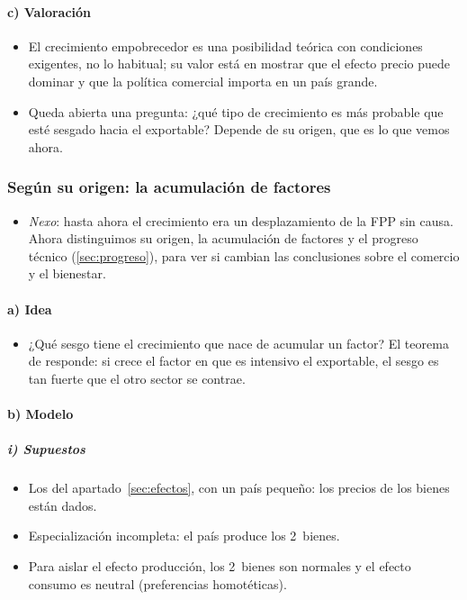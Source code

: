 \documentclass[11pt]{article}
\begin{document}
\paragraph{c) Valoración}

\begin{itemize}
\item El crecimiento empobrecedor es una posibilidad teórica con condiciones exigentes, no lo habitual; su valor está en mostrar que el efecto precio puede dominar y que la política comercial importa en un país grande.
\item Queda abierta una pregunta: ¿qué tipo de crecimiento es más probable que esté sesgado hacia el exportable? Depende de su origen, que es lo que vemos ahora.
\end{itemize}

\subsubsection{Según su origen: la acumulación de factores}\label{sec:origen}

\begin{itemize}
\item \emph{Nexo}: hasta ahora el crecimiento era un desplazamiento de la FPP sin causa. Ahora distinguimos su origen, la acumulación de factores y el progreso técnico (\ref{sec:progreso}), para ver si cambian las conclusiones sobre el comercio y el bienestar.
\end{itemize}

\paragraph{a) Idea}

\begin{itemize}
\item ¿Qué sesgo tiene el crecimiento que nace de acumular un factor? El teorema de \textcite{Rybczynski1955Factor} responde: si crece el factor en que es intensivo el exportable, el sesgo es tan fuerte que el otro sector se contrae.
\end{itemize}

\paragraph{b) Modelo}

\subparagraph{i) Supuestos}

\begin{itemize}
\item Los del apartado~\ref{sec:efectos}, con un país pequeño: los precios de los bienes están dados.
\item Especialización incompleta: el país produce los 2~bienes.
\item Para aislar el efecto producción, los 2~bienes son normales y el efecto consumo es neutral (preferencias homotéticas).
\end{itemize}
\end{document}
